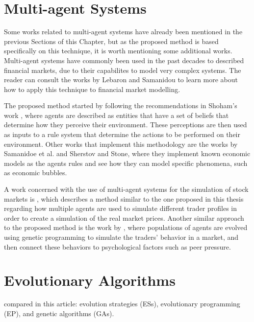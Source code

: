 \section{Multi-agent Systems}
\label{section:multi-agent-systems}

Some works related to multi-agent systems have already been mentioned in the
previous Sections of this Chapter, but as the proposed method is based
specifically on this technique, it is worth mentioning some additional
works. Multi-agent systems have commonly been used in the past decades to
described financial markets, due to their capabilites to model very complex
systems. The reader can consult the works by Lebaron \cite{Lebaron2001} and
Samanidou \cite{Bundesbank2007} to learn more about how to apply this technique
to financial market modelling.

The proposed method started by following the recommendations in Shoham's work
\cite{Shoham1993} \cite{Shoham2009}, where agents are described as entities that
have a set of beliefs that determine how they perceive their environment. These
perceptions are then used as inputs to a rule system that determine the actions
to be performed on their environment. Other works that implement this
methodology are the works by Samanidoe et al. \cite{Bundesbank2007} and Sherstov
and Stone\cite{Sherstov2005}, where they implement known economic models as the
agents rules and see how they can model specific phenomena, such as economic
bubbles.

A work concerned with the use of multi-agent systems for the simulation of stock
markets is \cite{Kendall2003}, which describes a method similar to the one
proposed in this thesis regarding how multiple agents are used to simulate
different trader profiles in order to create a simulation of the real market
prices. Another similar approach to the proposed method is the work by
\cite{Chen2001}, where populations of agents are evolved using genetic
programming to simulate the traders' behavior in a market, and then connect
these behaviors to psychological factors such as peer pressure.

\section{Evolutionary Algorithms}
\label{section:evolutionary-algorithms}

\cite{Back2008} compared in this article: evolution strategies (ESs),
evolutionary programming (EP), and genetic algorithms (GAs).

